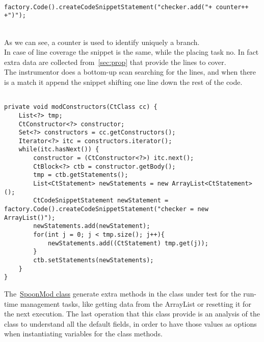 \begin{minipage}{\linewidth}
\begin{lstlisting}[caption={Snippet creation},label={lst:addSnippet}]% Start your code-block
	
factory.Code().createCodeSnippetStatement("checker.add("+ counter++ +")");
\end{lstlisting}
\end{minipage}\\
As we can see, a counter is used to identify uniquely a branch.\\
In case of line coverage the snippet is the same, while the placing task no.
In fact extra data are collected from~\ref{sec:prop} that provide the lines to cover.\\
The instrumentor does a bottom-up scan searching for the lines, and when there is a match it append the snippet shifting one line down the rest of the code.\\

\begin{minipage}{\linewidth}
\begin{lstlisting}[caption={The function to add the ArrayList instantiation snippet},label={lst:modConstructor}]% Start your code-block

private void modConstructors(CtClass cc) {
	List<?> tmp;
	CtConstructor<?> constructor;
	Set<?> constructors = cc.getConstructors();
	Iterator<?> itc = constructors.iterator();
	while(itc.hasNext()) {
		constructor = (CtConstructor<?>) itc.next();
		CtBlock<?> ctb = constructor.getBody();
		tmp = ctb.getStatements();
		List<CtStatement> newStatements = new ArrayList<CtStatement>();
		CtCodeSnippetStatement newStatement = factory.Code().createCodeSnippetStatement("checker = new ArrayList()");
		newStatements.add(newStatement);
		for(int j = 0; j < tmp.size(); j++){
			newStatements.add((CtStatement) tmp.get(j));
		}
		ctb.setStatements(newStatements);
	}
}
\end{lstlisting}
\end{minipage}
The~\href{\projRootLink/support/spoon/SpoonMod.java}{SpoonMod class} generate extra methods in the class under test for the run-time management tasks, like getting data from the ArrayList or resetting it for the next execution.
The last operation that this class provide is an analysis of the class to understand all the default fields, in order to have those values as options when instantiating variables for the class methods.
